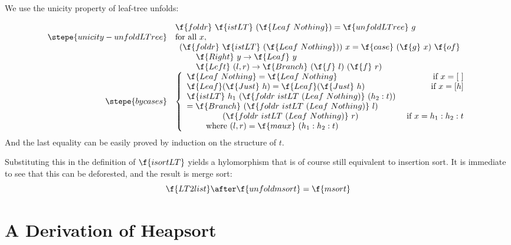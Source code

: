 \documentclass[a4paper,11pt]{llncs}
\begin{document}
\proof

We use the unicity property of leaf-tree unfolds:

$$
\begin{array}{rl}
& \f{foldr}\ \f{istLT}\ (\f{Leaf\ Nothing}) =  \f{unfoldLTree}\ g\\  
\stepe{unicity-unfoldLTree}
& \mbox{for all } x,\\
&\begin{array}{l}
(\f{foldr}\ \f{istLT}\ (\f{Leaf\ Nothing}))\ x  =  \f{case}\ (\f{g}\
x)\ \f{of}\\  
\qquad \f{Right}\ y \to \f{Leaf}\ y\\
\qquad \f{Left}\ (l,r) \to \f{Branch}\ (\f{f}\ l)\ (\f{f}\ r)
\end{array}\\
\stepe{by cases}
& \left \{
\begin{array}{lr}
\f{Leaf\ Nothing} = \f{Leaf\ Nothing} & \mbox{ if }x = [\ ]\\
\f{Leaf} (\f{Just}\ h) = \f{Leaf} (\f{Just}\ h) & \mbox{ if } x =
[h]\\
\f{istLT}\ h_1\ (\f{foldr\ istLT\ (Leaf\ Nothing)}\ (h_2:t))\\
 = \f{Branch}\
(\f{foldr\ istLT\ (Leaf\ Nothing)}\ l) 
\\
\qquad \qquad \ (\f{foldr\ istLT\ (Leaf\ Nothing)}\ r) &  \mbox{ if }
x = h_1:h_2:t \\
\qquad \mbox{ where } (l,r) = \f{maux}\ (h_1:h_2:t)
\end{array}
\right .
\end{array}
$$
And the last equality can be easily proved by induction on the
structure of $t$.
\endproof

Substituting this in the definition of $\f{isortLT}$ yields a
hylomorphism that is of course still equivalent to insertion sort. It
is immediate to see that this can be deforested, and the result is
merge sort:
$$
\f{LT2list} \after \f{unfoldmsort} = \f{msort}
$$




\section{A Derivation of Heapsort}
\label{sec:deriv-heap-sort}


\def\foldr{\f{foldr}}
\def\foldl{\f{foldl}}
\def\inL{\f{in_L}}
\def\inT{\f{in_T}}
\def\id{\f{id}}
\def\isortBST{\f{isortBST}}
\def\BST2list{\f{BST2list}}
\def\buildBST{\f{buildBST}}
\def\buildBSTacc{\f{bAcc}}
\def\istBST{\f{istBST}}
\def\Left{\f{Left}}
\def\Right{\f{Right}}
\def\Empty{\f{Empty}}
\def\Node{\f{Node}}
\def\qaux{\f{qaux}}
\def\insert{\f{insert}}
\def\Nil{[\,]}
\def\isortH{\f{isortH}}
\def\H2list{\f{H2list}}
\def\buildH{\f{buildH}}
\def\istH{\f{istH}}
\def\haux{\f{haux}}
\end{document}
